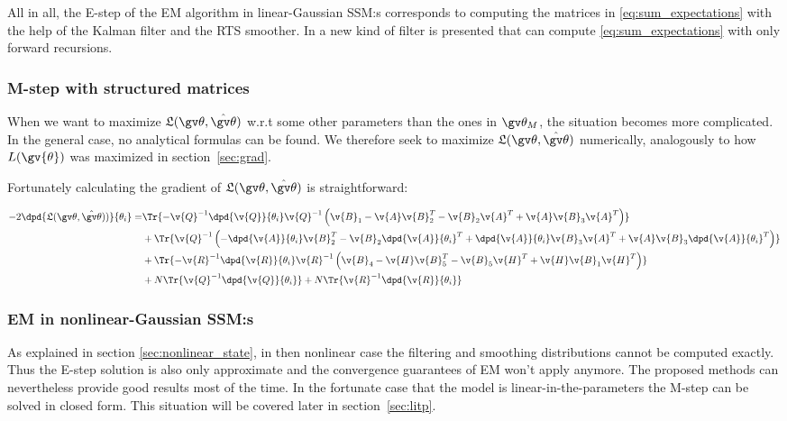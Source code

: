 All in all, the E-step of the 
EM algorithm in linear-Gaussian SSM:s corresponds to computing
the matrices in \eqref{eq:sum_expectations} with the help of the Kalman filter and
the RTS smoother. In \parencite{Elliott1999} a new kind of filter is presented that
can compute \eqref{eq:sum_expectations} with only forward recursions. 



\subsubsection{M-step with structured matrices}
\cite{Wills2011}
When we want to maximize $\Lb(\Th,\hat{\Th})$ w.r.t some other
parameters than the ones in $\Th_M$, the situation becomes more complicated.
In the general case, no analytical formulas can be found. We therefore seek
to maximize $\Lb(\Th,\hat{\Th})$ numerically, analogously to how $L(\gv{\theta})$
was maximized in section~\ref{sec:grad}.

Fortunately calculating the gradient of $\Lb(\Th,\hat{\Th})$ is straightforward:

\begin{align}
\begin{split}
	-2\dpd{\Lb(\Th,\hat{\Th}))}{\theta_i}
	=&\Tr{-\v{Q}^{-1}\dpd{\v{Q}}{\theta_i}\v{Q}^{-1}
	\left(\v{B}_1-\v{A}\v{B}_2^T-\v{B}_2\v{A}^T+\v{A}\v{B}_3\v{A}^T\right)}\\
	&+\Tr{\v{Q}^{-1}\left(-\dpd{\v{A}}{\theta_i}\v{B}_2^T-\v{B}_2\dpd{\v{A}}{\theta_i}^T+\dpd{\v{A}}{\theta_i}\v{B}_3\v{A}^T+\v{A}\v{B}_3\dpd{\v{A}}{\theta_i}^T\right)}\\
	&+\Tr{-\v{R}^{-1}\dpd{\v{R}}{\theta_i}\v{R}^{-1}
	\left(\v{B}_4-\v{H}\v{B}_5^T-\v{B}_5\v{H}^T+\v{H}\v{B}_1\v{H}^T\right)}\\
	&+N\Tr{\v{Q}^{-1}\dpd{\v{Q}}{\theta_i}}
	+N\Tr{\v{R}^{-1}\dpd{\v{R}}{\theta_i}}\\
	\label{eq:dLB}
\end{split}
\end{align}


\subsubsection{EM in nonlinear-Gaussian SSM:s}%

As explained in section \ref{sec:nonlinear_state}, in then nonlinear case
the filtering and smoothing distributions cannot be computed exactly.
Thus the E-step solution is also only approximate and the convergence
guarantees of EM won't apply anymore. The proposed methods can nevertheless
provide good results most of the time. In the fortunate case that the
model is linear-in-the-parameters the M-step can be solved in closed form.
This situation will be covered later in section~\ref{sec:litp}.

